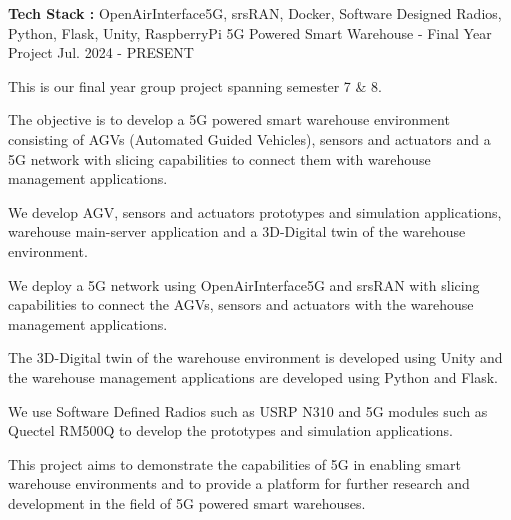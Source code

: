 


\begin{cventries}


\cventry
{\textbf{Tech Stack :} OpenAirInterface5G, srsRAN, Docker, Software Designed Radios, Python, Flask, Unity, RaspberryPi} %
{5G Powered Smart Warehouse - Final Year Project} %
{\href{https://github.com/Stealth-Devs-Org/Stealth-SDC-Sem6}{}} %
{Jul. 2024 - PRESENT} %
{ %
\begin{cvitems}
\item {This is our final year group project spanning semester 7 \& 8.}
\item {The objective is to develop a 5G powered smart warehouse environment consisting of AGVs (Automated Guided Vehicles), sensors and actuators and a 5G network with slicing capabilities to connect them with warehouse management applications.}
\item {We develop AGV, sensors and actuators prototypes and simulation applications, warehouse main-server application and a 3D-Digital twin of the warehouse environment.}
\item {We deploy a 5G network using OpenAirInterface5G and srsRAN with slicing capabilities to connect the AGVs, sensors and actuators with the warehouse management applications.}
\item {The 3D-Digital twin of the warehouse environment is developed using Unity and the warehouse management applications are developed using Python and Flask.}
\item {We use Software Defined Radios such as USRP N310 and 5G modules such as Quectel RM500Q to develop the prototypes and simulation applications.}
\item {This project aims to demonstrate the capabilities of 5G in enabling smart warehouse environments and to provide a platform for further research and development in the field of 5G powered smart warehouses.}
\end{cvitems}
}


\end{cventries}
